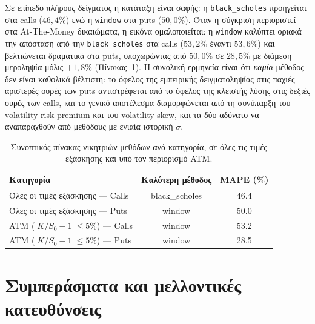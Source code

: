 \documentclass[12pt]{article}
\begin{document}
Σε επίπεδο πλήρους δείγματος η κατάταξη είναι σαφής: η \texttt{black\_scholes} προηγείται στα calls ($46{,}4\%$) ενώ η \texttt{window} στα puts ($50{,}0\%$). Όταν η σύγκριση περιοριστεί στα At-The-Money δικαιώματα, η εικόνα ομαλοποιείται: η \texttt{window} καλύπτει οριακά την απόσταση από την \texttt{black\_scholes} στα calls ($53{,}2\%$ έναντι $53{,}6\%$) και βελτιώνεται δραματικά στα puts, υποχωρώντας από $50{,}0\%$ σε $28{,}5\%$ με διάμεση μεροληψία μόλις $+1{,}8\%$ (Πίνακας~\ref{tab:summary_atm}). Η συνολική ερμηνεία είναι ότι \emph{καμία} μέθοδος δεν είναι καθολικά βέλτιστη: το όφελος της εμπειρικής δειγματοληψίας στις παχιές αριστερές ουρές των puts αντιστρέφεται από το όφελος της κλειστής λύσης στις δεξιές ουρές των calls, και το γενικό αποτέλεσμα διαμορφώνεται από τη συνύπαρξη του volatility risk premium και του volatility skew, και τα δύο αδύνατο να αναπαραχθούν από μεθόδους με ενιαία ιστορική $\sigma$.

\begin{table}[h]
\centering
\begin{tabular}{lcc}
\hline
Κατηγορία & Καλύτερη μέθοδος & MAPE (\%) \\ \hline
Όλες οι τιμές εξάσκησης --- Calls & black\_scholes & 46.4 \\
Όλες οι τιμές εξάσκησης --- Puts  & window         & 50.0 \\
ATM ($\lvert K/S_0 - 1\rvert \leq 5\%$) --- Calls & window & 53.2 \\
ATM ($\lvert K/S_0 - 1\rvert \leq 5\%$) --- Puts  & window & 28.5 \\ \hline
\end{tabular}
\caption{Συνοπτικός πίνακας νικητριών μεθόδων ανά κατηγορία, σε όλες τις τιμές εξάσκησης και υπό τον περιορισμό ATM.}
\label{tab:summary_atm}
\end{table}

\newpage

\section{Συμπεράσματα και μελλοντικές κατευθύνσεις}
\end{document}
